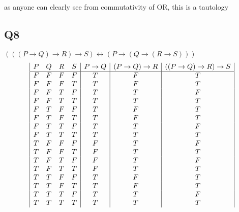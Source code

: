\documentclass[a4paper,12pt]{article}
\begin{document}
as anyone can clearly see from commutativity of OR, this is a tautology
\pagebreak
\subsection{Q8}
$(((P \rightarrow Q) \rightarrow R) \rightarrow S) \leftrightarrow (P \rightarrow (Q \rightarrow (R \rightarrow S)))$\\
\begin{displaymath}
\begin {array} {|c c c c|c|c|c|c|c}
P & Q & R & S & 
P \rightarrow Q &
(P \rightarrow Q) \rightarrow R &
((P \rightarrow Q) \rightarrow R) \rightarrow S \\
\hline

F & F & F & F & T & F & T\\
F & F & F & T & T & F & T\\
F & F & T & F & T & T & F\\
F & F & T & T & T & T & T\\
F & T & F & F & T & F & T\\
F & T & F & T & T & F & T\\
F & T & T & F & T & T & F\\
F & T & T & T & T & T & T\\
T & F & F & F & F & T & F\\
T & F & F & T & F & T & T\\
T & F & T & F & F & T & F\\
T & F & T & T & F & T & T\\
T & T & F & F & T & F & T\\
T & T & F & T & T & F & T\\
T & T & T & F & T & T & F\\
T & T & T & T & T & T & T\\

\end{array}
\end{displaymath}
\end{document}

